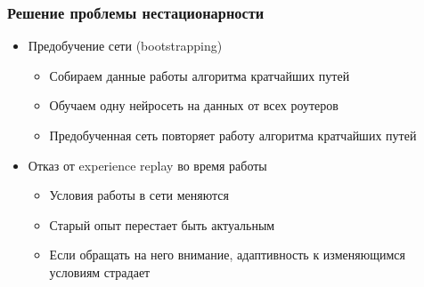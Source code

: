 \documentclass{beamer}
\begin{document}


\begin{frame}
  \frametitle{Решение проблемы нестационарности}
  \begin{itemize}
  \item Предобучение сети (bootstrapping)
    \begin{itemize}
      \item Собираем данные работы алгоритма кратчайших путей
      \item Обучаем одну нейросеть на данных от всех роутеров
      \item Предобученная сеть повторяет работу алгоритма кратчайших путей
    \end{itemize}
  \item Отказ от experience replay во время работы
    \begin{itemize}
    \item Условия работы в сети меняются
    \item Старый опыт перестает быть актуальным
    \item Если обращать на него внимание, адаптивность к изменяющимся условиям страдает
    \end{itemize}
  \end{itemize}
\end{frame}

\end{document}
